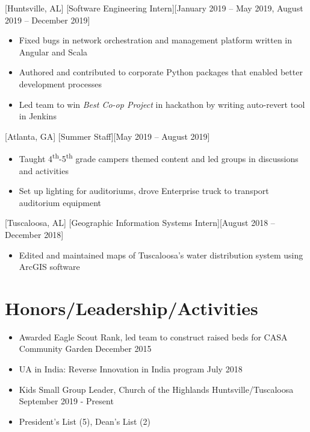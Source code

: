 \documentclass[hidelinks, 11pt]{article}
\begin{document}
[Huntsville, AL]
[Software Engineering Intern][January 2019 – May 2019, August 2019 – December 2019]

\begin{itemize}
  \item Fixed bugs in network orchestration and management platform written in Angular and Scala
  \item Authored and contributed to corporate Python packages that enabled better development processes
  \item Led team to win \textit{Best Co-op Project} in hackathon by writing auto-revert tool in Jenkins
\end{itemize}

[Atlanta, GA]
[Summer Staff][May 2019 – August 2019]

\begin{itemize}
  \item Taught 4\textsuperscript{th}-5\textsuperscript{th} grade campers themed content and led groups in discussions and activities
  \item Set up lighting for auditoriums, drove Enterprise truck to transport auditorium equipment
\end{itemize}

[Tuscaloosa, AL]
[Geographic Information Systems Intern][August 2018 – December 2018]

\begin{itemize}
  \item Edited and maintained maps of Tuscaloosa’s water distribution system using ArcGIS software
\end{itemize}

\section{Honors/Leadership/Activities}

\begin{itemize}
  \item Awarded Eagle Scout Rank, led team to construct raised beds for CASA Community Garden \hfill December 2015
  \item UA in India: Reverse Innovation in India program \hfill July 2018
  \item Kids Small Group Leader, Church of the Highlands Huntsville/Tuscaloosa \hfill September 2019 - Present
  \item President's List (5), Dean's List (2)
\end{itemize}
\end{document}
